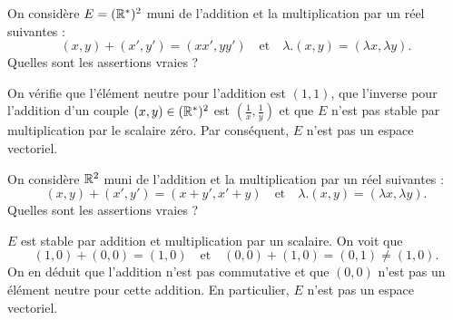 \begin{question}
On considère $E= (\mathbb{R}^*)^2$ muni de l'addition et la multiplication par un réel suivantes :
$$(x,y)+(x',y')=(xx',yy')\quad \mbox{et}\quad \lambda .(x,y)= (\lambda x,\lambda y).$$
Quelles sont les assertions vraies ?
\begin{answers}  
\end{answers}
\begin{explanations} On vérifie que l'élément neutre pour l'addition est $(1,1)$, que l'inverse pour l'addition d'un couple $(x,y) \in (\mathbb{R}^*)^2$ est $\displaystyle\left(\frac{1}{x}, \frac{1}{y}\right)$ et que $E$ n'est pas stable par multiplication par le scalaire zéro. Par conséquent, $E$ n'est pas un espace vectoriel.
\end{explanations}
\end{question}

\begin{question}
On considère $\mathbb{R}^2$ muni de l'addition et la multiplication par un réel suivantes :
$$(x,y)+(x',y')=(x+y',x'+y)\quad \mbox{et}\quad \lambda . (x,y) = (\lambda x, \lambda y).$$
Quelles sont les assertions vraies ?
\begin{answers}  
\end{answers}
\begin{explanations} $E$ est stable par addition et multiplication par un scalaire. On voit que
$$(1,0)+(0,0)=(1,0)\quad \mbox{et}\quad (0,0)+(1,0)=(0,1)\neq (1,0).$$ 
On en déduit que l'addition n'est pas commutative et que $(0,0)$ n'est pas un élément neutre pour cette addition. En particulier, $E$ n'est pas un espace vectoriel.
\end{explanations}
\end{question}

